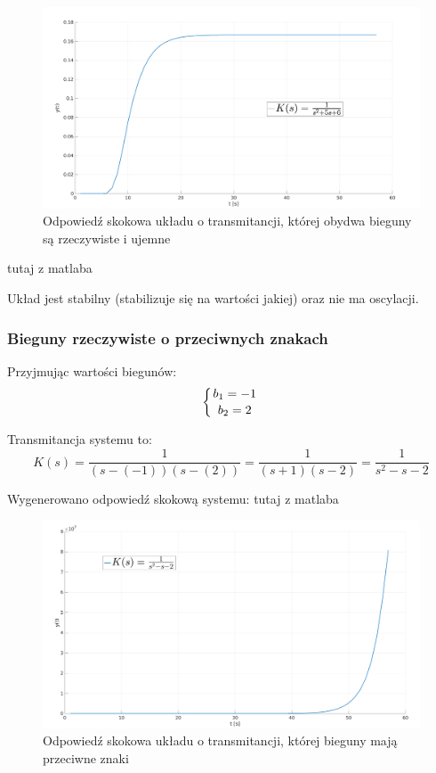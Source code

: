\documentclass[12pt]{article}
\begin{document}
\begin{figure}[H]
    \centering
    \includegraphics[width=18cm]{rzeczywiste_ujemne.png}
    \caption{Odpowiedź skokowa układu o transmitancji, której obydwa bieguny są rzeczywiste i ujemne}
\end{figure}



\colorbox{WildStrawberry}{tutaj z matlaba}

Układ jest stabilny (stabilizuje się na wartości \colorbox{WildStrawberry}{jakiej}) oraz nie ma oscylacji.


\subsubsection{Bieguny rzeczywiste o przeciwnych znakach}

Przyjmując wartości biegunów:
\begin{equation*}
    \left\{{{b_1 = -1}\atop {b_2 = 2}}\right.
\end{equation*}

Transmitancja systemu to:
\begin{equation}
    K(s) = \frac{1}{(s-(-1))(s-(2))} = \frac{1}{(s+1)(s-2)} = \frac{1}{s^2-s-2}
\end{equation}

Wygenerowano odpowiedź skokową systemu:
\colorbox{WildStrawberry}{tutaj z matlaba}

\begin{figure}[H]
    \centering
    \includegraphics[width=18cm]{rzeczywiste_przeciwne_znaki.png}
    \caption{Odpowiedź skokowa układu o transmitancji, której bieguny mają przeciwne znaki}
\end{figure}
\end{document}
